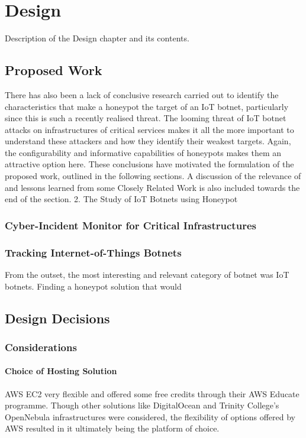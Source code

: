 \chapter{Design}

Description of the Design chapter and its contents.


\section{Proposed Work}



There has also been a lack of conclusive research carried out to identify the characteristics that make a honeypot the target of an IoT botnet, particularly since this is such a recently realised threat. The looming threat of IoT botnet attacks on infrastructures of critical services makes it all the more important to understand these attackers and how they identify their weakest targets. Again, the configurability and informative capabilities of honeypots makes them an attractive option here. These conclusions have motivated the formulation of the proposed work, outlined in the following sections. A discussion of the relevance of and lessons learned from some Closely Related Work is also included towards the end of the section.
2. The Study of IoT Botnets using Honeypot

\subsection{Cyber-Incident Monitor for Critical Infrastructures}

\subsection{Tracking Internet-of-Things Botnets}

From the outset, the most interesting and relevant category of botnet was IoT botnets. Finding a honeypot solution that would

\section{Design Decisions}
	\subsection{Considerations}
		\subsubsection{Choice of Hosting Solution}
		AWS EC2 very flexible and offered some free credits through their AWS Educate programme. Though other solutions like DigitalOcean and Trinity College's OpenNebula infrastructures were considered, the flexibility of options offered by AWS resulted in it ultimately being the platform of choice.
